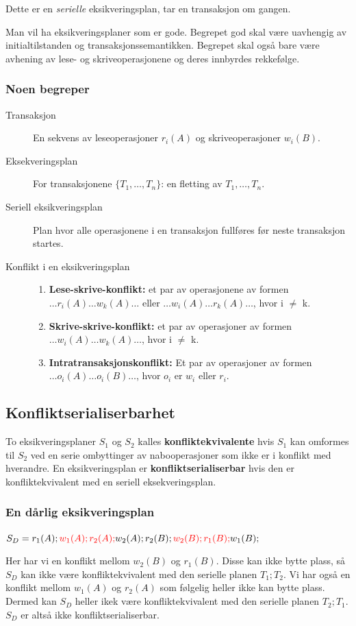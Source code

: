 \documentclass[12pt,a4paper]{article}
\begin{document}
Dette er en \textit{serielle} eksikveringsplan, tar en transaksjon om gangen.

Man vil ha eksikveringsplaner som er gode. Begrepet god skal være uavhengig av initialtilstanden og transaksjonssemantikken. Begrepet skal også bare være avhening av lese- og skriveoperasjonene og deres innbyrdes rekkefølge.

\subsubsection{Noen begreper}
\begin{description}
\item[Transaksjon] En sekvens av leseoperasjoner $r_i(A)$ og skriveoperasjoner $w_i(B)$.
\item[Eksekveringsplan] For transaksjonene $\{T_1, \dots, T_n\}$: en fletting av $T_1, \dots, T_n$.
\item[Seriell eksikveringsplan] Plan hvor alle operasjonene i en transaksjon fullføres før neste transaksjon startes.
\item[Konflikt i en eksikveringsplan] 
	\begin{enumerate}
	\item{\textbf{Lese-skrive-konflikt:} et par av operasjonene av formen $\dots r_i(A) \dots w_k(A) \dots$ eller $\dots w_i(A) \dots r_k(A) \dots$, hvor i $\neq$ k.}
	\item{\textbf{Skrive-skrive-konflikt:} et par av operasjoner av formen $\dots w_i(A) \dots w_k(A) \dots$, hvor i $\neq$ k.}
	\item{\textbf{Intratransaksjonskonflikt:} Et par av operasjoner av formen $\dots o_i(A) \dots o_i(B) \dots$, hvor $o_i$ er $w_i$ eller $r_i$.}
	\end{enumerate}
\end{description}

\subsection{Konfliktserialiserbarhet}
To eksikveringsplaner $S_1$ og $S_2$ kalles \textbf{konfliktekvivalente} hvis $S_1$ kan omformes til $S_2$ ved en serie ombyttinger av nabooperasjoner som ikke er i konflikt med hverandre. En eksikveringsplan er \textbf{konfliktserialiserbar} hvis den er konfliktekvivalent med en seriell eksekveringsplan.

\subsubsection{En dårlig eksikveringsplan} 
$S_D = r_1(A);\textcolor{red}{w_1(A);r_2(A);}w_2(A);r_2(B);\textcolor{red}{w_2(B);r_1(B);}w_1(B);$

Her har vi en konflikt mellom $w_2(B)$ og $r_1(B)$. Disse kan ikke bytte plass, så $S_D$ kan ikke være konfliktekvivalent med den serielle planen $T_1;T_2$. Vi har også en konflikt mellom $w_1(A)$ og $r_2(A)$ som følgelig heller ikke kan bytte plass. Dermed kan $S_D$ heller ikek være konfliktekvivalent med den serielle planen $T_2;T_1$. $S_D$ er altså ikke konfliktserialiserbar.
\end{document}

